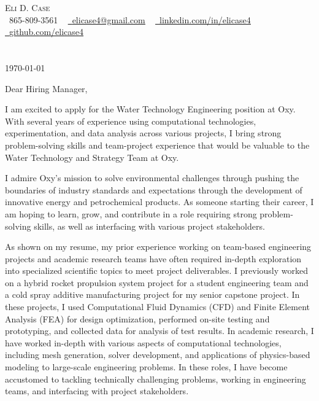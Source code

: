 \documentclass[letterpaper,11pt]{letter}
\newcommand{\paragraphbreak}{\vspace{5pt}}
\begin{document}
\begin{center}
    {\large \scshape Eli D. Case} \\ \vspace{1pt}
    \small \raisebox{-0.1\height}\faPhone\ 865-809-3561 ~ \href{mailto:elicase4@gmail.com}{\raisebox{-0.2\height}\faEnvelope\  \underline{elicase4@gmail.com}} ~ 
    \href{https://linkedin.com/in/elicase4}{\raisebox{-0.2\height}\faLinkedin\ \underline{linkedin.com/in/elicase4}}  ~
    \href{https://github.com/elicase4}{\raisebox{-0.2\height}\faGithub\ \underline{github.com/elicase4}}
    \vspace{-4pt}
\end{center}

\section{}

\today \\

\paragraphbreak

Dear Hiring Manager,

\paragraphbreak

I am excited to apply for the Water Technology Engineering position at Oxy. With several years of experience using computational technologies, experimentation, and data analysis across various projects, I bring strong problem-solving skills and team-project experience that would be valuable to the Water Technology and Strategy Team at Oxy. 

\paragraphbreak

I admire Oxy's mission to solve environmental challenges through pushing the boundaries of industry standards and expectations through the development of innovative energy and petrochemical products. As someone starting their career, I am hoping to learn, grow, and contribute in a role requiring strong problem-solving skills, as well as interfacing with various project stakeholders. 

\paragraphbreak


As shown on my resume, my prior experience working on team-based engineering projects and academic research teams have often required in-depth exploration into specialized scientific topics to meet project deliverables. I previously worked on a hybrid rocket propulsion system project for a student engineering team and a cold spray additive manufacturing project for my senior capstone project. In these projects, I used Computational Fluid Dynamics (CFD) and Finite Element Analysis (FEA) for design optimization, performed on-site testing and prototyping, and collected data for analysis of test results. In academic research, I have worked in-depth with various aspects of computational technologies, including mesh generation, solver development, and applications of physics-based modeling to large-scale engineering problems. In these roles, I have become accustomed to tackling technically challenging problems, working in engineering teams, and interfacing with project stakeholders.  
\end{document}
